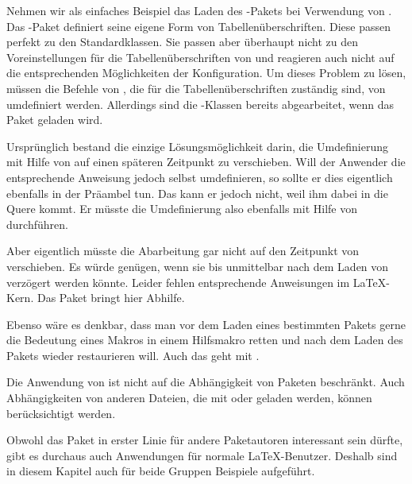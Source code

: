 Nehmen wir als einfaches Beispiel das Laden des
-Pakets bei Verwendung von \KOMAScript{}. Das
-Paket definiert seine eigene Form von
Tabellenüberschriften. Diese passen perfekt zu den Standardklassen. Sie passen
aber überhaupt nicht zu den Voreinstellungen für die Tabellenüberschriften von
\KOMAScript{} und reagieren auch nicht auf die entsprechenden Möglichkeiten
der Konfiguration. Um dieses Problem zu lösen, müssen die Befehle von
, die für die Tabellenüberschriften zuständig sind, von
\KOMAScript{} umdefiniert werden. Allerdings sind die \KOMAScript{}-Klassen
bereits abgearbeitet, wenn das Paket geladen wird.

Ursprünglich bestand die einzige %
\iffalse%
Möglichkeit, dieses Problem zu lösen %
\else%
Lösungsmöglichkeit %
\fi%
darin, die Umdefinierung mit Hilfe von  auf einen
späteren Zeitpunkt zu verschieben. Will der Anwender die entsprechende
Anweisung jedoch selbst umdefinieren, so sollte er dies eigentlich ebenfalls
in der Präambel tun. Das kann er jedoch nicht, weil \KOMAScript{} ihm dabei in
die Quere kommt. Er müsste die Umdefinierung also ebenfalls mit Hilfe von
 durchführen.

Aber eigentlich müsste \KOMAScript{} die Abarbeitung gar
nicht auf den Zeitpunkt von  verschieben. Es
würde genügen, wenn sie bis unmittelbar nach dem Laden von 
verzögert werden könnte. Leider fehlen entsprechende Anweisungen im
\LaTeX-Kern. Das Paket  bringt hier Abhilfe.

Ebenso wäre es denkbar, dass man vor dem Laden
eines bestimmten Pakets gerne die Bedeutung eines Makros in einem Hilfsmakro
retten und nach dem Laden des Pakets wieder restaurieren will. Auch das geht
mit .

Die Anwendung von  ist nicht auf die Abhängigkeit von
Paketen beschränkt. Auch Abhängigkeiten von anderen Dateien, die mit
 oder  geladen werden, können
berücksichtigt werden.%
\iffalse%
So kann beispielsweise dafür gesorgt werden, dass das nicht unkritische Laden
einer Datei wie \File{french.ldf} automatisch zu einer Warnung führt.%
\fi

Obwohl das Paket in erster Linie für andere Paketautoren interessant sein
dürfte, gibt es durchaus auch Anwendungen für normale \LaTeX-Benutzer. Deshalb
sind in diesem Kapitel auch für beide Gruppen Beispiele aufgeführt.

